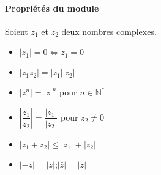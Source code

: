 \paragraph{Propriétés du module}

Soient $z_1$ et $z_2$ deux nombres complexes.
\begin{itemize}
    \item $|z_1|=0 \Leftrightarrow z_1=0$
    \item $|z_1z_2|=|z_1||z_2|$
    \item $|z^n|=|z|^n$ pour $n\in\mathbb{N}^*$
    \item $\left|\dfrac{z_1}{z_2}\right|=\dfrac{|z_1|}{|z_2|}$ pour $z_2\neq0$
    \item $|z_1+z_2|\le|z_1|+|z_2|$
    \item $|-z|=|z|$;$|\bar{z}|=|z|$
\end{itemize}


